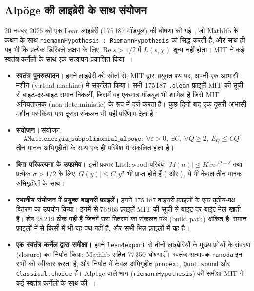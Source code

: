 \documentclass[11pt,a4paper]{amsart}
\theoremstyle{definition}
\theoremstyle{remark}
\renewcommand{\Re}{\operatorname{Re}}
\begin{document}
\subsection*{Alp\"oge की लाइब्रेरी के साथ संयोजन}
20 नवंबर 2026 को एक Lean लाइब्रेरी (175\,187 मॉड्यूल) की घोषणा की गई~\cite{Alpoge}, जो Mathlib के कथन के साथ \texttt{riemannHypothesis : RiemannHypothesis} को सिद्ध करती है, और साथ ही यह भी कि प्रत्येक डिरिक्ले लक्षण के लिए $\Re s>1/2$ में $L(s,\chi)$ शून्य नहीं होता। MIT ने कई स्वतंत्र कर्नेलों के साथ एक सत्यापन प्रकाशित किया~\cite{MIT}।
\begin{itemize}
\item \textbf{स्वतंत्र पुनरुत्पादन।} हमने लाइब्रेरी को स्रोतों से, MIT द्वारा प्रयुक्त पथ पर, अपनी एक आभासी मशीन (virtual machine) में संकलित किया। सभी 175\,187 \texttt{.olean} फ़ाइलें MIT की सूची से बाइट-दर-बाइट समान निकलीं, जिसमें वह एकमात्र मॉड्यूल भी शामिल है जिसे MIT अनियतात्मक (non-deterministic) के रूप में दर्ज करता है। कुछ दिनों बाद एक दूसरी आभासी मशीन पर किया गया दूसरा संकलन भी यही परिणाम देता है।
\item \textbf{संयोजन।} संयोजन
\[
\texttt{AMate.energia\_subpolinomial\_alpoge}:\ \forall\varepsilon>0,\ \exists C,\ \forall Q\ge2,\ E_Q\le CQ^\varepsilon
\]
तीन मानक अभिगृहीतों के साथ एक ही परिवेश में संकलित होता है।
\item \textbf{बिना परिकल्पना के उपप्रमेय।} इसी प्रकार Littlewood परिबंध $|M(n)|\le K_\delta n^{1/2+\delta}$ तथा प्रत्येक $\sigma>1/2$ के लिए $|G(y)|\le C_{\sigma}y^{\sigma}$ भी प्राप्त होते हैं ( और ), ये भी केवल तीन मानक अभिगृहीतों के साथ।
\item \textbf{स्थानीय संयोजन में प्रयुक्त बाइनरी फ़ाइलें।} हमने 175\,187 बाइनरी फ़ाइलों के एक तृतीय-पक्ष वितरण का उपयोग किया। इनमें से 76\,968 फ़ाइलें MIT की सूची से बाइट-दर-बाइट मेल खाती हैं। शेष 98\,219 ठीक वही हैं जिनमें उस वितरण का संकलन पथ (build path) अंकित है: समान फ़ाइलों में से किसी में भी यह पथ नहीं है, और सभी भिन्न फ़ाइलों में यह है।
\item \textbf{एक स्वतंत्र कर्नेल द्वारा समीक्षा।} हमने \texttt{lean4export} से तीनों लाइब्रेरियों के मुख्य प्रमेयों के संवरण (closure) का निर्यात किया: Mathlib सहित 77\,350 घोषणाएँ। स्वतंत्र सत्यापक \texttt{nanoda} इन सभी को स्वीकार करता है, और निर्यात में केवल अभिगृहीत \texttt{propext}, \texttt{Quot.sound} और \texttt{Classical.choice} हैं। Alp\"oge वाले भाग (\texttt{riemannHypothesis}) की समीक्षा MIT ने कई स्वतंत्र कर्नेलों के साथ की~\cite{MIT}।
\end{itemize}
\end{document}
